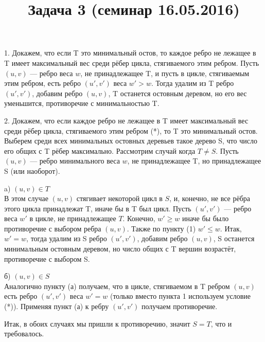 \documentclass{article}
\title{Задача 3 (семинар 16.05.2016)}
\author{}
\date{}
\begin{document}
\maketitle

1. Докажем, что если T это минимальный остов, то каждое ребро не лежащее в T имеет максимальный вес среди рёбер цикла, стягиваемого этим ребром.
Пусть $(u, v)$ --- ребро веса $w$, не принадлежащее T, и пусть в цикле, стягиваемым этим ребром, есть ребро $(u', v')$ веса $w'>w$. 
Тогда удалим из T ребро $(u', v')$, добавим ребро $(u, v)$, T останется остовным деревом, но его вес уменьшится, противоречие с минимальностью T.

2. Докажем, что если каждое ребро не лежащее в T имеет максимальный вес среди рёбер цикла, стягиваемого этим ребром (*), то T это минимальный остов.
Выберем среди всех минимальных остовных деревьев такое дерево S, что число его общих с T рёбер максимально.
Рассмотрим случай когда $T \neq S$.
Пусть $(u, v)$ --- ребро минимального веса $w$, не принадлежащее T, но принадлежащее S (или наоборот).

a) $(u, v) \in T$\\
В этом случае $(u, v)$ стягивает некоторой цикл в $S$, и, конечно, не все рёбра этого цикла принадлежат T, иначе бы в T был цикл. 
Пусть $(u', v')$ --- ребро веса $w'$ в цикле, не принадлежащее $T$. 
Конечно, $w' \geq w$ иначе бы было противоречие с выбором ребра $(u, v)$.
Также по пункту (1) $w' \leq w$. Итак, $w' = w$, тогда удалим из S ребро $(u', v')$, добавим ребро $(u, v)$, 
S останется минимальным остовным деревом, но число общих с T вершин возрастёт, противоречие с выбором S.

б) $(u, v) \in S$\\
Аналогично пункту (а) получаем, что в цикле, стягиваемом в T ребром $(u, v)$ есть ребро $(u', v')$ веса $w'=w$ (только вместо пункта 1 используем условие (*)).
Применяя пункт (а) к ребру $(u', v')$ получаем противоречие.

Итак, в обоих случаях мы пришли к противоречию, значит $S=T$, что и требовалось.
\end{document}
